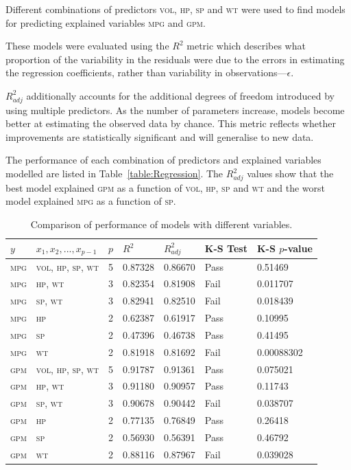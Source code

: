 \documentclass[a4paper,10pt,twocolumn]{article}
\newcommand{\MPG}{\textsc{mpg}\xspace}
\newcommand{\GPM}{\textsc{gpm}\xspace}
\newcommand{\VOL}{\textsc{vol}\xspace}
\newcommand{\HP}{\textsc{hp}\xspace}
\newcommand{\SP}{\textsc{sp}\xspace}
\newcommand{\WT}{\textsc{wt}\xspace}
\begin{document}
Different combinations of predictors \VOL, \HP, \SP and \WT were used to find 
models for predicting explained variables \MPG and \GPM.

These models were evaluated using the $R^2$ metric which describes what  
proportion of the variability in the residuals were due to the errors in 
estimating the regression coefficients, rather than variability in 
observations---$\epsilon$.

$R^2_{adj}$ additionally accounts for the additional degrees of freedom 
introduced by using multiple predictors. As the number of parameters increase, 
models become better at estimating the observed data by chance. This metric
reflects whether improvements are statistically significant and will generalise 
to new data.

The performance of each combination of predictors and explained variables 
modelled are listed in Table~\vref{table:Regression}. The $R^2_{adj}$ values 
show that the best model explained \GPM as a function of \VOL, \HP, \SP and 
\WT and the worst model explained \MPG as a function of \SP.

\begin{table}
    \centering
    \begin{tabular}{lllllll}
    \toprule
    $y$ & $x_1, x_2, ..., x_{p-1}$ & $p$ & $R^2$ & $R^2_{adj}$ & K-S Test & K-S 
    $p$-value \\
    \midrule
    \MPG & \VOL, \HP, \SP, \WT & 5 & 0.87328 & 0.86670 & Pass & 0.51469 \\
    \MPG & \HP, \WT            & 3 & 0.82354 & 0.81908 & Fail & 0.011707 \\
    \MPG & \SP, \WT            & 3 & 0.82941 & 0.82510 & Fail & 0.018439 \\
    \MPG & \HP                 & 2 & 0.62387 & 0.61917 & Pass & 0.10995 \\
    \MPG & \SP                 & 2 & 0.47396 & 0.46738 & Pass & 0.41495 \\
    \MPG & \WT                 & 2 & 0.81918 & 0.81692 & Fail & 0.00088302 \\
    \GPM & \VOL, \HP, \SP, \WT & 5 & 0.91787 & 0.91361 & Pass & 0.075021 \\
    \GPM & \HP, \WT            & 3 & 0.91180 & 0.90957 & Pass & 0.11743 \\
    \GPM & \SP, \WT            & 3 & 0.90678 & 0.90442 & Fail & 0.038707 \\
    \GPM & \HP                 & 2 & 0.77135 & 0.76849 & Pass & 0.26418 \\
    \GPM & \SP                 & 2 & 0.56930 & 0.56391 & Pass & 0.46792 \\
    \GPM & \WT                 & 2 & 0.88116 & 0.87967 & Fail & 0.039028 \\
    \bottomrule
    \end{tabular}
    \caption{Comparison of performance of models with different variables.}
    \label{table:Regression}
\end{table}
    
\end{document}
